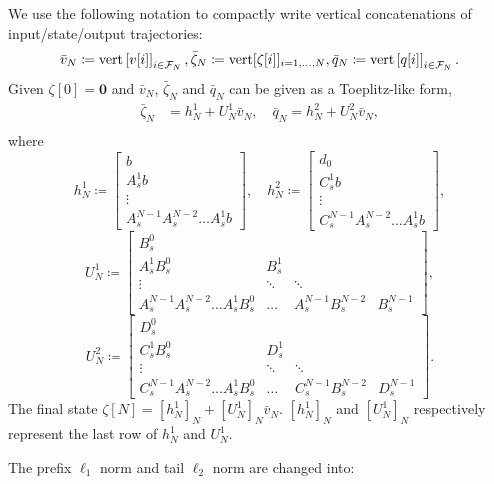 We use the following notation to compactly write vertical concatenations of input/state/output trajectories:
\[
\bar{v}_N \coloneqq {\mathrm{vert}}\left[v[i]\right]_{i \in \mathcal{F}_N}, \bar{\zeta}_N \coloneqq {\mathrm{vert}}[\zeta[i]]_{i = 1, \hdots ,N}, \bar{q}_N \coloneqq {\mathrm{vert}}\left[q[i]\right]_{i \in \mathcal{F}_N}.
\]
Given \(\zeta[0] = \mathbf{0}\) and \(\bar{v}_N\), \(\bar{\zeta}_N\) and \(\bar{q}_N\) can be given as a Toeplitz-like form,
\begin{align*}
\bar{\zeta}_N & = h_N^1 + U_N^1 \bar{v}_N,\quad \bar{q}_N = h_N^2 + U_N^2 \bar{v}_N,\\
\end{align*}
where
\[
h_N^1 \coloneqq 
\left[\begin{array}{c}
    b \\
    A_s^1 b\\
    \vdots\\
    A_s^{N - 1} A_s^{N-2} \hdots A_s^1 b
\end{array}\right],\quad
h_N^2 \coloneqq 
\left[\begin{array}{c}
    d_0 \\
    C_s^1 b\\
    \vdots\\
    C_s^{N - 1} A_s^{N-2} \hdots A_s^1 b
\end{array}\right],
\]
\[
U_N^1 \coloneqq
\left[
\begin{array}{cccc}
    B_s^0 & & & \\
    A_s^1 B_s^0 & B_s^1 & &\\
    \vdots & \ddots & \ddots & \\
    A_s^{N - 1} A_s^{N-2} \hdots A_s^1 B_s^0 & \hdots & A_s^{N - 1} B_s^{N-2} & B_s^{N-1}
\end{array}\right],
\]
\[
U_N^2 \coloneqq
\left[
\begin{array}{cccc}
    D_s^0 & & &\\
    C_s^1 B_s^0 & D_s^1 & &\\
    \vdots & \ddots & \ddots & \\
    C_s^{N - 1} A_s^{N-2} \hdots A_s^1 B_s^0 & \hdots & C_s^{N - 1} B_s^{N-2} & D_s^{N-1}
\end{array}\right].
\]
The final state \(\zeta[N] = [h_N^1]_N + [U_N^1]_N \bar{v}_N\). \([h_N^1]_N\) and \([U_N^1]_N\) respectively represent the last row of \(h_N^1\) and \(U_N^1\).

The prefix \(\ell_1\) norm and tail \(\ell_2\) norm are changed into:

